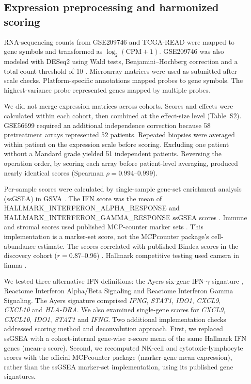 \documentclass[11pt,a4paper]{article}
\begin{document}
\subsection{Expression preprocessing and harmonized scoring}

RNA-sequencing counts from GSE209746 and TCGA-READ were mapped to gene symbols and transformed as $\log_2(\mathrm{CPM}+1)$. GSE209746 was also modeled with DESeq2 using Wald tests, Benjamini--Hochberg correction and a total-count threshold of 10 \cite{Love}. Microarray matrices were used as submitted after scale checks. Platform-specific annotations mapped probes to gene symbols. The highest-variance probe represented genes mapped by multiple probes.

We did not merge expression matrices across cohorts. Scores and effects were calculated within each cohort, then combined at the effect-size level (Table~S2). GSE56699 required an additional independence correction because 58 pretreatment arrays represented 52 patients. Repeated biopsies were averaged within patient on the expression scale before scoring. Excluding one patient without a Mandard grade yielded 51 independent patients. Reversing the operation order, by scoring each array before patient-level averaging, produced nearly identical scores (Spearman $\rho=0.994$--$0.999$).

Per-sample scores were calculated by single-sample gene-set enrichment analysis (ssGSEA) in GSVA \cite{Hanzelmann}. The IFN score was the mean of HALLMARK\_INTERFERON\_ALPHA\_RESPONSE and HALLMARK\_INTERFERON\_GAMMA\_RESPONSE ssGSEA scores \cite{Liberzon}. Immune and stromal scores used published MCP-counter marker sets \cite{Becht}. This implementation is a marker-set score, not the MCPcounter package's cell-abundance estimate. The scores correlated with published Bindea scores in the discovery cohort ($r=0.87$--$0.96$) \cite{Bindea}. Hallmark competitive testing used camera \cite{Wu} in limma \cite{Ritchie}.

We tested three alternative IFN definitions: the Ayers six-gene IFN-$\gamma$ signature \cite{Ayers}, Reactome Interferon Alpha/Beta Signaling and Reactome Interferon Gamma Signaling. The Ayers signature comprised \textit{IFNG}, \textit{STAT1}, \textit{IDO1}, \textit{CXCL9}, \textit{CXCL10} and \textit{HLA-DRA}. We also examined single-gene scores for \textit{CXCL9}, \textit{CXCL10}, \textit{IDO1}, \textit{STAT1} and \textit{IFNG}. Two additional implementation checks addressed scoring method and deconvolution approach. First, we replaced ssGSEA with a cohort-internal gene-wise $z$-score mean of the same Hallmark IFN genes (mean-$z$ score). Second, we recomputed NK-cell and cytotoxic-lymphocyte scores with the official MCPcounter package (marker-gene mean expression), rather than the ssGSEA marker-set implementation, using its published gene signatures.
\end{document}
